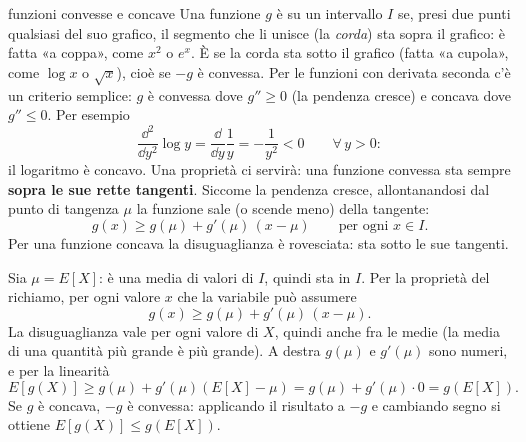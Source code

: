 \begin{richiamo}{funzioni convesse e concave}
Una funzione $g$ è  su un intervallo $I$ se, presi due punti qualsiasi del suo grafico, il segmento che
li unisce (la \emph{corda}) sta sopra il grafico: è fatta «a coppa», come $x^2$ o $e^x$. È  se la corda
sta sotto il grafico (fatta «a cupola», come $\log x$ o $\sqrt{x}$), cioè se $-g$ è convessa. Per le funzioni con
derivata seconda c'è un criterio semplice: $g$ è convessa dove $g'' \geq 0$ (la pendenza cresce) e concava dove $g''
\leq 0$. Per esempio
\[ \frac{\dd^2}{\dd y^2} \log y = \frac{\dd}{\dd y} \frac{1}{y} = -\frac{1}{y^2} < 0 \qquad \forall\, y > 0 : \]
il logaritmo è concavo. Una proprietà ci servirà: una funzione convessa sta sempre \textbf{sopra le sue rette
tangenti}. Siccome la pendenza cresce, allontanandosi dal punto di tangenza $\mu$ la funzione sale (o scende meno) della
tangente:
\[ g(x) \geq g(\mu) + g'(\mu)\, (x - \mu) \qquad \text{per ogni } x \in I . \]
Per una funzione concava la disuguaglianza è rovesciata: sta sotto le sue tangenti.
\end{richiamo}


\begin{dimostrazione}
 Sia $\mu = E[X]$: è una media di valori di $I$, quindi sta in $I$. Per la proprietà
del richiamo, per ogni valore $x$ che la variabile può assumere
\[ g(x) \geq g(\mu) + g'(\mu)\, (x - \mu) . \]
 La disuguaglianza vale per ogni valore di $X$, quindi anche fra le medie (la media di una
quantità più grande è più grande). A destra $g(\mu)$ e $g'(\mu)$ sono numeri, e per la linearità
\[ E[g(X)] \geq g(\mu) + g'(\mu) \left( E[X] - \mu \right) = g(\mu) + g'(\mu) \cdot 0 = g\left( E[X] \right) . \]
 Se $g$ è concava, $-g$ è convessa: applicando il risultato a $-g$ e cambiando segno si
ottiene $E[g(X)] \leq g(E[X])$.
\end{dimostrazione}

